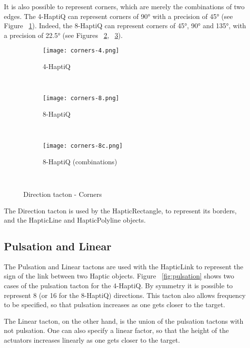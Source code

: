 It is also possible to represent corners, which are merely the combinations of two edges. The 4-HaptiQ can represent corners of 90° with a precision of 45° (see Figure ~\ref{fig:corner-4}). Indeed, the 8-HaptiQ can represent corners of 45°, 90° and 135°, with a precision of 22.5° (see Figures ~\ref{fig:corner-8}, ~\ref{fig:corner-8c}). 

\begin{figure}[H]
        \centering
        \begin{subfigure}[H]{0.5\textwidth}
                \texttt{[image: corners-4.png]}
                \caption{4-HaptiQ}
                \label{fig:corner-4}
        \end{subfigure}%
        ~ %
          
        \begin{subfigure}[H]{0.4\textwidth}
                \texttt{[image: corners-8.png]}
                \caption{8-HaptiQ}
                \label{fig:corner-8}
        \end{subfigure}
        ~ 
         \begin{subfigure}[H]{0.4\textwidth}
                \texttt{[image: corners-8c.png]}
                \caption{8-HaptiQ (combinations)}
                \label{fig:corner-8c}
        \end{subfigure}
        ~ %
        \caption{Direction tacton - Corners}\label{fig:corners}
\end{figure}

The Direction tacton is used by the HapticRectangle, to represent its borders, and the HapticLine and HapticPolyline objects. 

\subsection{Pulsation and Linear}
The Pulsation and Linear tactons are used with the HapticLink to represent the sign of the link between two Haptic objects. Figure ~\ref{fig:pulsation} shows two cases of the pulsation tacton for the 4-HaptiQ. By symmetry it is possible to represent 8 (or 16 for the 8-HaptiQ) directions. This tacton also allows frequency to be specified, so that pulsation increases as one gets closer to the target. 

The Linear tacton, on the other hand, is the union of the pulsation tactons with not pulsation. One can also specify a linear factor, so that the height of the actuators increases linearly as one gets closer to the target. 

